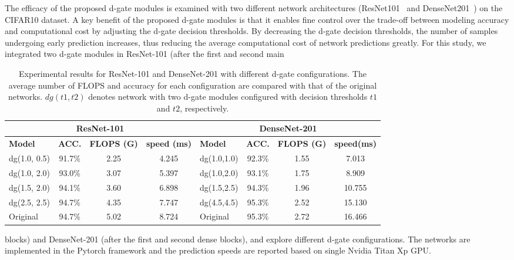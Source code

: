 \documentclass{article}
\begin{document}
The efficacy of the proposed d-gate modules is examined with two different network architectures (ResNet101~\cite{he2016deep} and DenseNet201~\cite{huang2017densely}) on the CIFAR10 dataset. A key benefit of the proposed d-gate modules is that it enables fine control over the trade-off between modeling accuracy and computational cost by adjusting the d-gate decision thresholds. By decreasing the d-gate decision thresholds, the number of samples undergoing early prediction increases, thus reducing the average computational cost of network predictions greatly.  For this study, we integrated two d-gate modules in ResNet-101 (after the first and second main \begin{table*}[t]
    \centering
    \caption{\footnotesize Experimental results for ResNet-101 and DenseNet-201 with different d-gate configurations. The average number of FLOPS and accuracy for each configuration are compared with that of the original networks. $dg(t1,t2)$ denotes network with two d-gate modules configured with decision thresholds $t1$ and $t2$, respectively. }
    \footnotesize
\begin{tabular}{l|c|c|c||l|c|c|c}
        \multicolumn{4}{c}{\bf ResNet-101}&\multicolumn{4}{c}{\bf DenseNet-201} \\ \hline
        \footnotesize \bf Model & \footnotesize \bf ACC. &\footnotesize \bf FLOPS (G) &\footnotesize \bf speed (ms) &\footnotesize \bf Model&\footnotesize \bf ACC. &\footnotesize \footnotesize  \bf FLOPS (G) &\footnotesize \bf speed(ms)   \\\hline
        dg(1.0, 0.5)& 91.7\%  &   2.25   & 4.245   & dg(1.0,1.0)  &  92.3\%  &  1.55 & 7.013 \\
        dg(1.0, 2.0)& 93.0\%  & 3.07      & 5.397   & dg(1.0,2.0) &  93.1\%  & 1.75  & 8.909\\
        dg(1.5, 2.0)& 94.1\%  & 3.60     & 6.898   & dg(1.5,2.5)  &  94.3\%  & 1.96 & 10.755\\
        dg(2.5, 2.5)& 94.7\%  & 4.35     & 7.747   & dg(4.5,4.5)  &  95.3\%  & 2.52  & 15.130\\ \hline
       Original         & 94.7\%  & 5.02     & 8.724   & Original        &  95.3\% & 2.72  & 16.466
    \end{tabular}
    \vspace{-0.2in}
    \label{tab:tab1}
\end{table*} blocks) and DenseNet-201 (after the first and second dense blocks), and explore different d-gate configurations.  The networks are implemented in the Pytorch framework and the prediction speeds are reported based on single Nvidia Titan Xp GPU.
\end{document}
